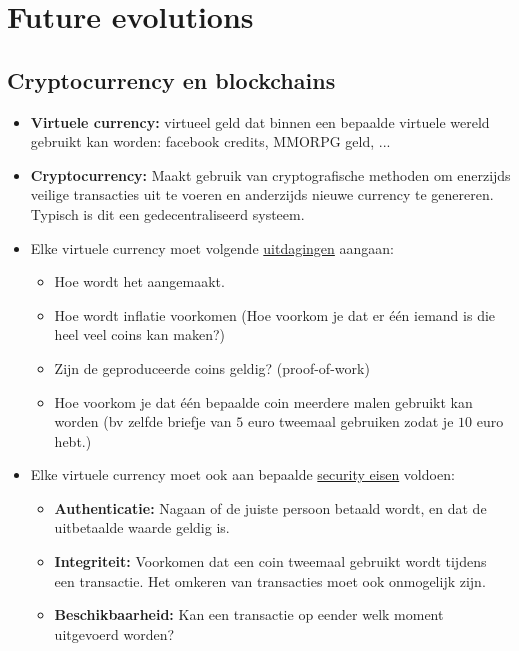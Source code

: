 \documentclass{report}
\begin{document}
	\chapter{Future evolutions}
	\section{Cryptocurrency en blockchains}
	\begin{itemize}
		\item[\info] \textbf{Virtuele currency:} virtueel geld dat binnen een bepaalde virtuele wereld gebruikt kan worden: facebook credits, MMORPG geld, ...
		\item[\info] \textbf{Cryptocurrency:} Maakt gebruik van cryptografische methoden om enerzijds veilige transacties uit te voeren en anderzijds nieuwe currency te genereren. Typisch is dit een gedecentraliseerd systeem.
		\item[\info] Elke virtuele currency moet volgende \underline{uitdagingen} aangaan:
		\begin{itemize}
			\item Hoe wordt het aangemaakt.
			\item Hoe wordt inflatie voorkomen (Hoe voorkom je dat er één iemand is die heel veel coins kan maken?)
			\item Zijn de geproduceerde coins geldig? (proof-of-work)
			\item Hoe voorkom je dat één bepaalde coin meerdere malen gebruikt kan worden (bv zelfde briefje van $5$ euro tweemaal gebruiken zodat je $10$ euro hebt.) 
		\end{itemize}
		\item[\info] Elke virtuele currency moet ook aan bepaalde \underline{security eisen} voldoen:
		\begin{itemize}
			\item[\info] \textbf{Authenticatie:} Nagaan of de juiste persoon betaald wordt, en dat de uitbetaalde waarde geldig is.
			\item[\info] \textbf{Integriteit:} Voorkomen dat een coin tweemaal gebruikt wordt tijdens een transactie. Het omkeren van transacties moet ook onmogelijk zijn.
			\item[\info] \textbf{Beschikbaarheid:} Kan een transactie op eender welk moment uitgevoerd worden?
		\end{itemize}
	\end{itemize}
\end{document}
